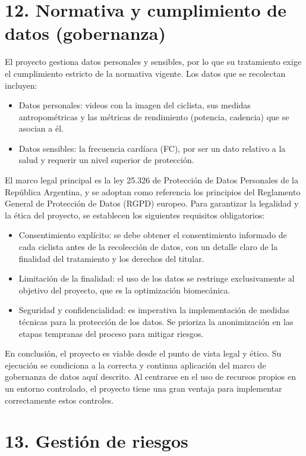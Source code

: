 \documentclass[
11pt, %
]{charter}
\begin{document}
\section{12. Normativa y cumplimiento de datos (gobernanza)}

El proyecto gestiona datos personales y sensibles, por lo que su tratamiento exige el cumplimiento estricto de la normativa vigente. Los datos que se recolectan incluyen:
\begin{itemize}
    \item Datos personales: videos con la imagen del ciclista, sus medidas antropométricas y las métricas de rendimiento (potencia, cadencia) que se asocian a él.
    \item Datos sensibles: la frecuencia cardíaca (FC), por ser un dato relativo a la salud y requerir un nivel superior de protección.
\end{itemize}

El marco legal principal es la ley 25.326 de Protección de Datos Personales de la República Argentina, y se adoptan como referencia los principios del Reglamento General de Protección de Datos (RGPD) europeo. Para garantizar la legalidad y la ética del proyecto, se establecen los siguientes requisitos obligatorios:
\begin{itemize}
    \item Consentimiento explícito: se debe obtener el consentimiento informado de cada ciclista antes de la recolección de datos, con un detalle claro de la finalidad del tratamiento y los derechos del titular.
    \item Limitación de la finalidad: el uso de los datos se restringe exclusivamente al objetivo del proyecto, que es la optimización biomecánica.
    \item Seguridad y confidencialidad: es imperativa la implementación de medidas técnicas para la protección de los datos. Se prioriza la anonimización en las etapas tempranas del proceso para mitigar riesgos.
\end{itemize}

En conclusión, el proyecto es viable desde el punto de vista legal y ético. Su ejecución se condiciona a la correcta y continua aplicación del marco de gobernanza de datos aquí descrito. Al centrarse en el uso de recursos propios en un entorno controlado, el proyecto tiene una gran ventaja para implementar correctamente estos controles.


\section{13. Gestión de riesgos}
\label{sec:riesgos}
\end{document}
